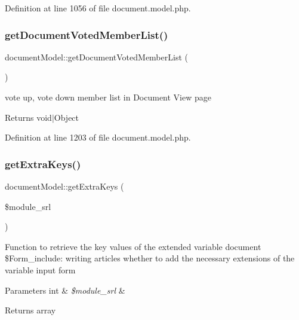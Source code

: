 Definition at line 1056 of file document.\+model.\+php.

\hypertarget{classdocumentModel_ab0f8e68c8df234d70ce66bd286df3015}{}\label{classdocumentModel_ab0f8e68c8df234d70ce66bd286df3015} 
\subsubsection{\texorpdfstring{get\+Document\+Voted\+Member\+List()}{getDocumentVotedMemberList()}}
{\footnotesize\ttfamily document\+Model\+::get\+Document\+Voted\+Member\+List (\begin{DoxyParamCaption}{ }\end{DoxyParamCaption})}

vote up, vote down member list in Document View page \begin{DoxyReturn}{Returns}
void$\vert$\+Object 
\end{DoxyReturn}


Definition at line 1203 of file document.\+model.\+php.

\hypertarget{classdocumentModel_a6ba19d36ef767c052851a630823c300a}{}\label{classdocumentModel_a6ba19d36ef767c052851a630823c300a} 
\subsubsection{\texorpdfstring{get\+Extra\+Keys()}{getExtraKeys()}}
{\footnotesize\ttfamily document\+Model\+::get\+Extra\+Keys (\begin{DoxyParamCaption}\item[{}]{\$module\+\_\+srl }\end{DoxyParamCaption})}

Function to retrieve the key values of the extended variable document \$\+Form\+\_\+include\+: writing articles whether to add the necessary extensions of the variable input form 
\begin{DoxyParams}[1]{Parameters}
int & {\em \$module\+\_\+srl} & \\
\hline
\end{DoxyParams}
\begin{DoxyReturn}{Returns}
array 
\end{DoxyReturn}


